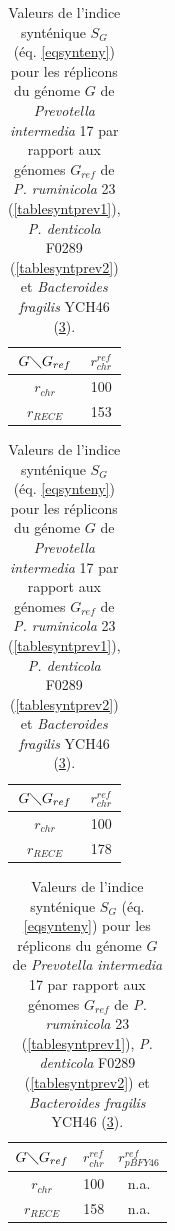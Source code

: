 \begin{table}[H]
   \begin{center}
   \hspace{-1.5cm}
   \caption[Valeurs de l'indice synténique pour \textit{Prevotella}]{Valeurs de l'indice synténique $S_{G}$ (éq. \ref{eqsynteny}) pour les réplicons du génome $G$ de \textit{Prevotella intermedia} 17 par rapport aux génomes $G_{ref}$ de \textit{P. ruminicola} 23 (\ref{tablesyntprev1}), \textit{P. denticola} F0289 (\ref{tablesyntprev2}) et \textit{Bacteroides fragilis} YCH46 (\ref{tablesyntprev3}).}\label{tablesyntprev}
   \begin{minipage}[t]{0.3\textwidth}
   \label{tablesyntprev1}
   	\begin{tabular}{c|c}
   		$G \diagdown G_{ref}$ & $r^{ref}_{chr}$\\
   		\hline
   		$r_{chr}$ & 100\\
   		$ r_{RECE}$ & 153\\
   	\end{tabular}
   \end{minipage}
   \hspace{0.5cm}
   \begin{minipage}[t]{0.3\textwidth}
   \label{tablesyntprev2}
   	\begin{tabular}{c|c}
   		$G \diagdown G_{ref}$ & $r^{ref}_{chr}$\\
   		\hline
   		$r_{chr}$ & 100\\
   		$ r_{RECE}$ & 178\\
	   \end{tabular}
   \end{minipage}
   \hspace{0.3cm}
   \begin{minipage}[t]{0.3\textwidth}
   \label{tablesyntprev3}
   	\begin{tabular}{c|cc}
   		$G \diagdown G_{ref}$ & $r^{ref}_{chr}$ & $r^{ref}_{pBFY46}$\\
   		\hline
   		$r_{chr}$ & 100 & n.a.\\
   		$ r_{RECE}$ & 158 & n.a.\\
   		\end{tabular}
   		\end{minipage}
   \end{center}
   \end{table}
   
